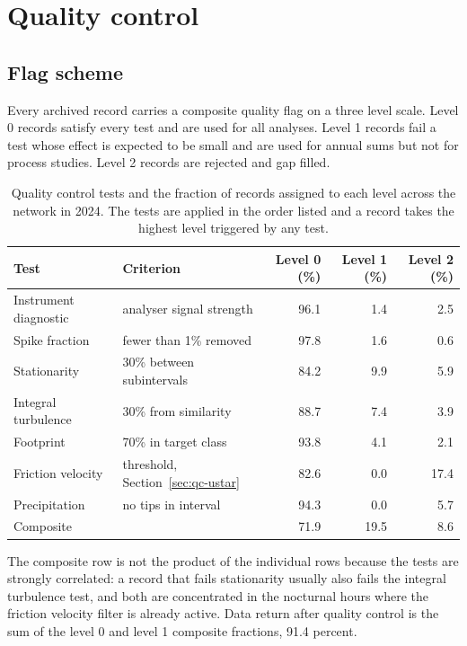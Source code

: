 \section{Quality control}
\label{sec:quality}

\subsection{Flag scheme}
\label{sec:qc-flags}

Every archived record carries a composite quality flag on a three level scale.
Level 0 records satisfy every test and are used for all analyses. Level 1
records fail a test whose effect is expected to be small and are used for annual
sums but not for process studies. Level 2 records are rejected and gap filled.

\begin{table}[t]
\centering
\small
\caption{Quality control tests and the fraction of records assigned to each
level across the network in 2024. The tests are applied in the order listed and
a record takes the highest level triggered by any test.}
\label{tab:qc-tests}
\begin{tabular}{llrrr}
\toprule
Test & Criterion & Level 0 (\%) & Level 1 (\%) & Level 2 (\%) \\
\midrule
Instrument diagnostic  & analyser signal strength & 96.1 & 1.4 & 2.5 \\
Spike fraction         & fewer than 1\% removed   & 97.8 & 1.6 & 0.6 \\
Stationarity           & 30\% between subintervals & 84.2 & 9.9 & 5.9 \\
Integral turbulence    & 30\% from similarity     & 88.7 & 7.4 & 3.9 \\
Footprint              & 70\% in target class     & 93.8 & 4.1 & 2.1 \\
Friction velocity      & threshold, Section~\ref{sec:qc-ustar} & 82.6 & 0.0 & 17.4 \\
Precipitation          & no tips in interval      & 94.3 & 0.0 & 5.7 \\
\midrule
Composite              &                          & 71.9 & 19.5 & 8.6 \\
\bottomrule
\end{tabular}
\end{table}

The composite row is not the product of the individual rows because the tests are
strongly correlated: a record that fails stationarity usually also fails the
integral turbulence test, and both are concentrated in the nocturnal hours where
the friction velocity filter is already active. Data return after quality control
is the sum of the level 0 and level 1 composite fractions, 91.4 percent.

